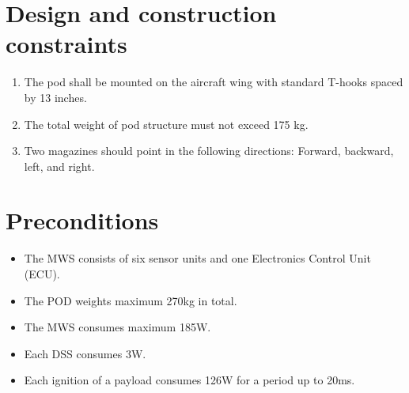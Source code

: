 \documentclass[Main]{subfiles}
\begin{document}
\section{Design and construction constraints}

\begin{enumerate}[{SR}-4.1]
\item The pod shall be mounted on the aircraft wing with standard T-hooks spaced by 13 inches.

\item The total weight of pod structure must not exceed 175 kg.

\item Two magazines should point in the following directions: Forward, backward, left, and right.

\end{enumerate}

\section{Preconditions}

\begin{itemize}
\item The MWS consists of six sensor units and one Electronics Control Unit (ECU).
\item The POD weights maximum 270kg in total.
\item The MWS consumes maximum 185W.
\item Each DSS consumes 3W.
\item Each ignition of a payload consumes 126W for a period up to 20ms.
\end{itemize}
\end{document}
